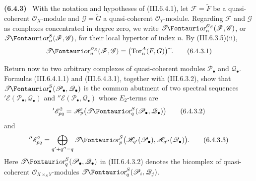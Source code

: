 \documentclass[10pt,oneside]{book}
\newcommand{\sh}[1]{\mathscr{#1}}
\newcommand{\shTor}{\sh{T}\textup{\kern-2.2pt{\Fontauri\slshape or}}}
\newcommand{\supertilde}{{\,\widetilde{\,}\,}}
\newcommand{\Tor}{\operatorname{Tor}}
\newcommand{\sref}[2][]{(#2)}
\newenvironment{env}[1][]{\par\medskip\noindent\textbf{(#1)}\ }{\par}
\begin{document}
\begin{env}[6.4.3]
\label{III.6.4.3}
With the notation and hypotheses of \sref{III.6.4.1}, let
$\sh F=\widetilde F$ be a quasi-coherent $\sh O_X$-module and
$\sh G=\widetilde G$ a quasi-coherent $\sh O_Y$-module.  Regarding
$\sh F$ and $\sh G$ as complexes concentrated in degree zero, we
write $\shTor_n^{\sh O_S}(\sh F,\sh G)$, or
$\shTor_n^S(\sh F,\sh G)$, for their local hypertor of index $n$.
By \sref{III.6.3.5}(ii),
\[
  \shTor_n^{\sh O_S}(\sh F,\sh G)
  =
  \bigl(\Tor_n^A(F,G)\bigr)\supertilde.
  \tag{6.4.3.1}\label{III.6.4.3.1}
\]

Return now to two arbitrary complexes of quasi-coherent modules
$\sh P_\bullet$ and $\sh Q_\bullet$.  Formulas
\sref{III.6.4.1.1} and \sref{III.6.4.3.1}, together with
\sref{III.6.3.2}, show that
$\shTor_\bullet^S(\sh P_\bullet,\sh Q_\bullet)$ is the common abutment
of two spectral sequences
$'\sh E(\sh P_\bullet,\sh Q_\bullet)$ and
$''\sh E(\sh P_\bullet,\sh Q_\bullet)$ whose $E_2$-terms are
\[
  '\sh E_{pq}^2
  =
  \sh H_p\bigl(\shTor_q^S(\sh P_\bullet,\sh Q_\bullet)\bigr)
  \tag{6.4.3.2}\label{III.6.4.3.2}
\]
and
\[
  ''\sh E_{pq}^2
  =
  \bigoplus_{q'+q''=q}
  \shTor_p^S
  \bigl(\sh H_{q'}(\sh P_\bullet),
        \sh H_{q''}(\sh Q_\bullet)\bigr).
  \tag{6.4.3.3}\label{III.6.4.3.3}
\]
Here $\shTor_q^S(\sh P_\bullet,\sh Q_\bullet)$ in
\sref{III.6.4.3.2} denotes the bicomplex of quasi-coherent
$\sh O_{X\times_SY}$-modules
$\shTor_q^S(\sh P_i,\sh Q_j)$.
\end{env}
\end{document}
